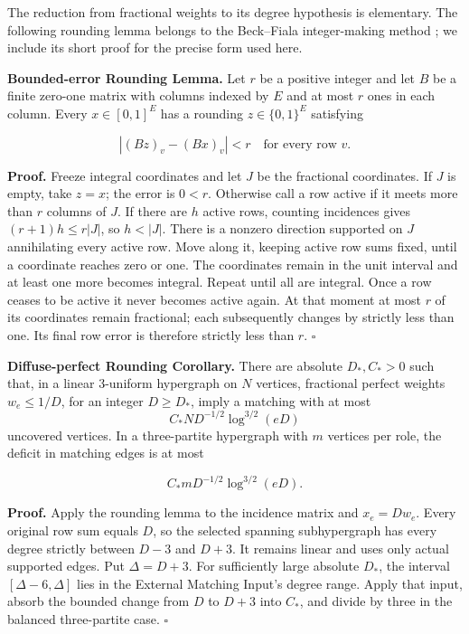 \documentclass[11pt,a4paper]{article}
\newcommand{\statementstart}{\par\addvspace{6pt plus 1pt minus 1pt}\noindent}
\newcommand{\labelledparagraphstart}{\par\addvspace{3pt plus 1pt minus 1pt}\noindent}
\begin{document}
The reduction from fractional weights to its degree hypothesis is elementary. The following rounding lemma belongs to the Beck--Fiala integer-making method \cite{BF81}; we include its short proof for the precise form used here.

\statementstart\textbf{Bounded-error Rounding Lemma.} Let \(r\) be a positive integer and let \(B\) be a finite zero-one matrix with columns indexed by \(E\) and at most \(r\) ones in each column. Every \(x\in[0,1]^E\) has a rounding \(z\in\{0,1\}^E\) satisfying

\[
|(Bz)_v-(Bx)_v|<r
\quad\text{for every row }v.
\]

\labelledparagraphstart\textbf{Proof.} Freeze integral coordinates and let \(J\) be the fractional coordinates. If \(J\) is empty, take \(z=x\); the error is \(0<r\). Otherwise call a row active if it meets more than \(r\) columns of \(J\). If there are \(h\) active rows, counting incidences gives \((r+1)h\le r|J|\), so \(h<|J|\). There is a nonzero direction supported on \(J\) annihilating every active row. Move along it, keeping active row sums fixed, until a coordinate reaches zero or one. The coordinates remain in the unit interval and at least one more becomes integral. Repeat until all are integral. Once a row ceases to be active it never becomes active again. At that moment at most \(r\) of its coordinates remain fractional; each subsequently changes by strictly less than one. Its final row error is therefore strictly less than \(r\). \(\square\)

\statementstart\textbf{Diffuse-perfect Rounding Corollary.} There are absolute \(D_*,C_*>0\) such that, in a linear 3-uniform hypergraph on \(N\) vertices, fractional perfect weights \(w_e\le1/D\), for an integer \(D\ge D_*\), imply a matching with at most \[
C_*ND^{-1/2}\log^{3/2}(eD)
\] uncovered vertices. In a three-partite hypergraph with \(m\) vertices per role, the deficit in matching edges is at most

\[
C_*mD^{-1/2}\log^{3/2}(eD).
\]

\labelledparagraphstart\textbf{Proof.} Apply the rounding lemma to the incidence matrix and \(x_e=Dw_e\). Every original row sum equals \(D\), so the selected spanning subhypergraph has every degree strictly between \(D-3\) and \(D+3\). It remains linear and uses only actual supported edges. Put \(\Delta=D+3\). For sufficiently large absolute \(D_*\), the interval \([\Delta-6,\Delta]\) lies in the External Matching Input's degree range. Apply that input, absorb the bounded change from \(D\) to \(D+3\) into \(C_*\), and divide by three in the balanced three-partite case. \(\square\)
\end{document}
